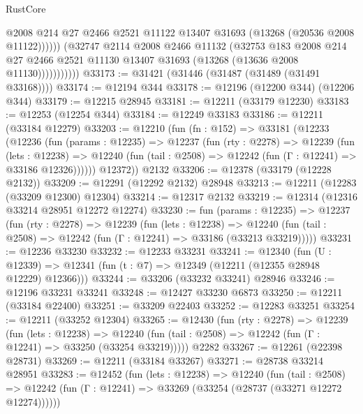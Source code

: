 \begin{lexlean}{RustCore}
\begin{coremodule}
                          @2008
                          @214
                          @27
                          @2466
                          @2521
                          @11122
                          @13407
                          @31693
                          (@13268 (@20536 @2008 @11122))))))
                  (@32747
                    @2114
                    @2008
                    @2466
                    @11132
                    (@32753
                      @183
                      @2008
                      @214
                      @27
                      @2466
                      @2521
                      @11130
                      @13407
                      @31693
                      (@13268 (@13636 @2008 @11130)))))))))))
@33173 := @31421 (@31446 (@31487 (@31489 (@31491 @33168))))
@33174 := @12194 @344
@33178 := @12196 (@12200 @344) (@12206 @344)
@33179 := @12215 @28945
@33181 := @12211 (@33179 @12230)
@33183 := @12253 (@12254 @344)
@33184 := @12249 @33183
@33186 := @12211 (@33184 @12279)
@33203 := @12210
    (fun (fn : @152) =>
    @33181
      (@12233
        (@12236
          (fun (params : @12235) =>
          @12237
            (fun (rty : @2278) =>
            @12239
              (fun (lets : @12238) =>
              @12240 (fun (tail : @2508) => @12242 (fun (Γ : @12241) => @33186 @12326))))))
        @12372))
    @2132
@33206 := @12378 (@33179 (@12228 @2132))
@33209 := @12291 (@12292 @2132) @28948
@33213 := @12211 (@12283 (@33209 @12300) @12304)
@33214 := @12317 @2132
@33219 := @12314 (@12316 @33214 @28951 @12272 @12274)
@33230 := fun (params : @12235) =>
  @12237
    (fun (rty : @2278) =>
    @12239
      (fun (lets : @12238) =>
      @12240 (fun (tail : @2508) => @12242 (fun (Γ : @12241) => @33186 (@33213 @33219)))))
@33231 := @12236 @33230
@33232 := @12233 @33231
@33241 := @12340
    (fun (U : @12339) => @12341 (fun (t : @7) => @12349 (@12211 (@12355 @28948 @12229) @12366)))
@33244 := @33206 (@33232 @33241) @28946
@33246 := @12196 @33231 @33241
@33248 := @12427 @33230 @6873
@33250 := @12211 (@33184 @22400)
@33251 := @33209 @22403
@33252 := @12283 @33251
@33254 := @12211 (@33252 @12304)
@33265 := @12430
    (fun (rty : @2278) =>
    @12239
      (fun (lets : @12238) =>
      @12240 (fun (tail : @2508) => @12242 (fun (Γ : @12241) => @33250 (@33254 @33219)))))
    @2282
@33267 := @12261 (@22398 @28731)
@33269 := @12211 (@33184 @33267)
@33271 := @28738 @33214 @28951
@33283 := @12452
    (fun (lets : @12238) =>
    @12240
      (fun (tail : @2508) =>
      @12242 (fun (Γ : @12241) => @33269 (@33254 (@28737 (@33271 @12272 @12274))))))

\end{coremodule}
\end{lexlean}
